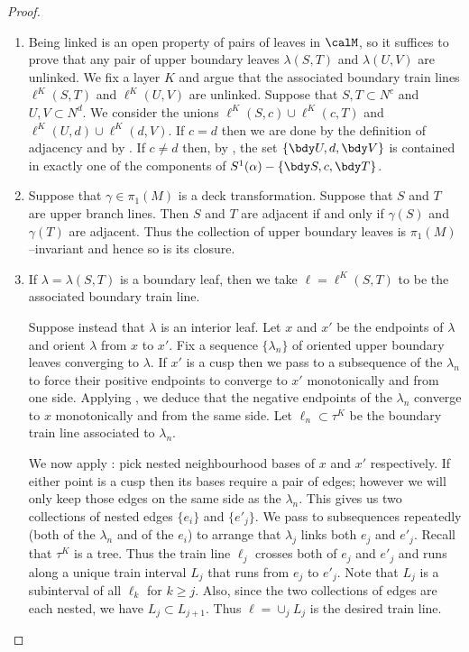 \documentclass[12pt]{amsart}
\begin{document}
\begin{proof}
\noindent
\begin{enumerate}
\item 
Being linked is an open property of pairs of leaves in $\calM$, so it suffices to prove that any pair of upper boundary leaves $\lambda(S, T)$ and $\lambda(U, V)$ are unlinked.  We fix a layer $K$ and argue that the associated boundary train lines $\ell^K(S, T)$ and $\ell^K(U, V)$ are unlinked.  Suppose that $S, T \subset N^c$ and $U, V \subset N^d$.  We consider the unions $\ell^K(S, c) \cup \ell^K(c, T)$ and $\ell^K(U, d) \cup \ell^K(d, V)$.  If $c = d$ then we are done by the definition of adjacency and by .  If $c \neq d$ then, by , the set $\{ \bdy U, d, \bdy V\}$ is contained in exactly one of the components of $S^1(\alpha) - \{ \bdy S, c, \bdy T\}$. 
\item 
Suppose that $\gamma \in \pi_1(M)$ is a deck transformation.  Suppose that $S$ and $T$ are upper branch lines.  Then $S$ and $T$ are adjacent if and only if $\gamma(S)$ and $\gamma(T)$ are adjacent.  Thus the collection of upper boundary leaves is $\pi_1(M)$--invariant and hence so is its closure. 
\item
If $\lambda = \lambda(S, T)$ is a boundary leaf, then we take $\ell = \ell^K(S, T)$ to be the associated boundary train line.  

Suppose instead that $\lambda$ is an interior leaf.  Let $x$ and $x'$ be the endpoints of $\lambda$ and orient $\lambda$ from $x$ to $x'$.  Fix a sequence $\{ \lambda_n \}$ of oriented upper boundary leaves converging to $\lambda$.  If $x'$ is a cusp then we pass to a subsequence of the $\lambda_n$ to force their positive endpoints to converge to $x'$ monotonically and from one side.  Applying , we deduce that the negative endpoints of the $\lambda_n$ converge to $x$ monotonically and from the same side.  Let $\ell_n \subset \tau^K$ be the boundary train line associated to $\lambda_n$.  

We now apply : pick nested neighbourhood bases of $x$ and $x'$ respectively.  If either point is a cusp then its bases require a pair of edges; however we will only keep those edges on the same side as the $\lambda_n$.  This gives us two collections of nested edges $\{ e_i \}$ and $\{ e'_j \}$.  We pass to subsequences repeatedly (both of the $\lambda_n$ and of the $e_i$) to arrange that $\lambda_j$ links both $e_j$ and $e'_j$.  Recall that $\tau^K$ is a tree.  Thus the train line $\ell_j$ crosses both of $e_j$ and $e'_j$ and runs along a unique train interval $L_j$ that runs from $e_j$ to $e'_j$.  Note that $L_j$ is a subinterval of all $\ell_k$ for $k \geq j$.  Also, since the two collections of edges are each nested, we have $L_j \subset L_{j+1}$.  Thus $\ell = \cup_j L_j$ is the desired train line. 


\end{enumerate}
\end{proof}
\end{document}
